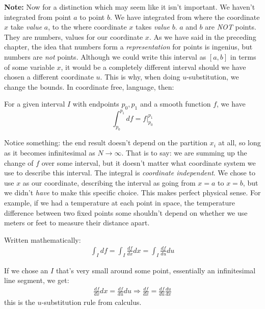 \documentclass[../master.tex]{subfiles}
\begin{document}
\noindent \textbf{Note:}
	Now for a distinction which may seem like it isn't important. We haven't integrated from point $a$ to point $b$. We have integrated from where the coordinate $x$ take \emph{value} $a$, to the where coordinate $x$ takes \emph{value} $b$. $a$ and $b$ are \emph{NOT} points. They are numbers, values for our coordinate $x$. As we have said in the preceding chapter, the idea that numbers form a \emph{representation} for points is ingenius, but numbers are \emph{not} points. Although we could write this interval as $[a,b]$ in terms of some variable $x$, it would be a completely different interval should we have chosen a different coordinate $u$. This is why, when doing $u$-substitution, we change the bounds. In coordinate free, language, then:

	
	\begin{theorem}\label{thm:FTOC}
		For a given interval $I$ with endpoints $p_0, p_1$ and a smooth function $f$, we have
		\begin{equation}
			  \int_{p_0}^{p_1} df = f \Big\rvert_{p_0}^{p_1} 
		\end{equation}
	\end{theorem}
	Notice something: the end result doesn't depend on the partition $x_i$ at all, so long as it becomes infinitesimal as $N \rightarrow \infty$. That is to say: we are summing up the change of $f$ over some interval, but it doesn't matter what coordinate system we use to describe this interval. The integral is \emph{coordinate independent}. We chose to use $x$ as our coordinate, describing the interval as going from $x=a$ to $x=b$, but we didn't \emph{have} to make this specific choice. This makes perfect physical sense. For example, if we had a temperature at each point in space, the temperature difference between two fixed points some shouldn't depend on whether we use meters or feet to measure their distance apart.  
	
	Written mathematically: 
	\begin{align*}
		\int_I df = \int_I \frac{df}{dx} dx = \int_I \frac{df}{du} du 
	\end{align*}
	
	If we chose an $I$ that's very small around some point, essentially an infinitesimal line segment, we get:
	\begin{align*}
		\frac{df}{dx} dx =  \frac{df}{du} du \Rightarrow \frac{df}{dx} = \frac{df}{du} \frac{du}{dx}
	\end{align*}
	this is the $u$-substitution rule from calculus.
	\\
\end{document}
